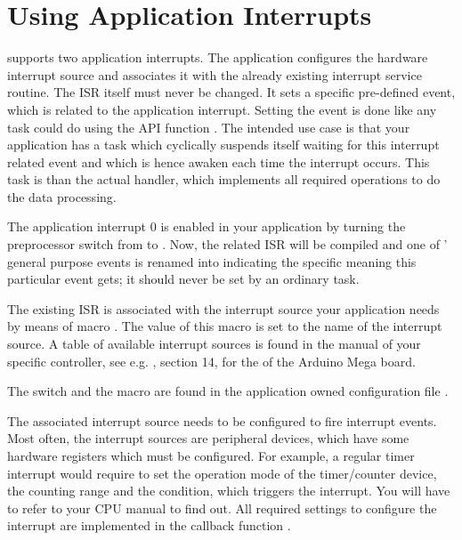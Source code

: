 \section{Using Application Interrupts}

\rtos{} supports two application interrupts. The application configures
the hardware interrupt source and associates it with the already existing
interrupt service routine. The ISR itself must never be changed. It sets a
specific pre-defined event, which is related to the application
interrupt. Setting the event is done like any task could do using the API
function . The intended use case is that your
application has a task which cyclically suspends itself waiting for this
interrupt related event and which is hence awaken each time the interrupt
occurs. This task is than the actual handler, which implements all
required operations to do the data processing.

The application interrupt 0 is enabled in your application by turning the
preprocessor switch  from
 to . Now, the related
ISR will be compiled and one of \rtos{}' general purpose events is renamed
into  indicating the specific
meaning this particular event gets; it should never be set by an ordinary
task.

The existing ISR is associated with the interrupt source your application
needs by means of macro . The value of this
macro is set to the name of the interrupt source. A table of available
interrupt sources is found in the manual of your specific controller, see
e.g. , section 14, for the \uC{} of the Arduino Mega
board.

The switch  and the macro
 are found in the application owned
configuration file .

The associated interrupt source needs to be configured to fire interrupt
events. Most often, the interrupt sources are peripheral devices, which
have some hardware registers which must be configured. For example, a
regular timer interrupt would require to set the operation mode of the
timer/counter device, the counting range and the condition, which triggers
the interrupt. You will have to refer to your CPU manual to find out. All
required settings to configure the interrupt are implemented in the
callback function .

